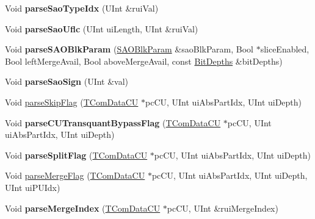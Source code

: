 \begin{DoxyCompactItemize}
\mbox{\label{class_t_dec_sbac_a43d19dfba15d817fd9676cc2f1a2d6d7}} 
Void {\bfseries parse\+Sao\+Type\+Idx} (U\+Int \&rui\+Val)
\item 
\mbox{\label{class_t_dec_sbac_ab4474e33f992ee7f021cfc5bdb618d3d}} 
Void {\bfseries parse\+Sao\+Uflc} (U\+Int ui\+Length, U\+Int \&rui\+Val)
\item 
\mbox{\label{class_t_dec_sbac_ab8f3fa94035abf0ac7531f4d63c73e01}} 
Void {\bfseries parse\+S\+A\+O\+Blk\+Param} (\hyperlink{struct_s_a_o_blk_param}{S\+A\+O\+Blk\+Param} \&sao\+Blk\+Param, Bool $\ast$slice\+Enabled, Bool left\+Merge\+Avail, Bool above\+Merge\+Avail, const \hyperlink{struct_bit_depths}{Bit\+Depths} \&bit\+Depths)
\item 
\mbox{\label{class_t_dec_sbac_aba0f9bd947829b5cff6e48a3c7440ff6}} 
Void {\bfseries parse\+Sao\+Sign} (U\+Int \&val)
\item 
Void \hyperlink{class_t_dec_sbac_a6cb8fe179c1ea3c06392e3488aa83428}{parse\+Skip\+Flag} (\hyperlink{class_t_com_data_c_u}{T\+Com\+Data\+CU} $\ast$pc\+CU, U\+Int ui\+Abs\+Part\+Idx, U\+Int ui\+Depth)
\item 
\mbox{\label{class_t_dec_sbac_ace37c59fe585382f541ae16ec3d69e9d}} 
Void {\bfseries parse\+C\+U\+Transquant\+Bypass\+Flag} (\hyperlink{class_t_com_data_c_u}{T\+Com\+Data\+CU} $\ast$pc\+CU, U\+Int ui\+Abs\+Part\+Idx, U\+Int ui\+Depth)
\item 
\mbox{\label{class_t_dec_sbac_a36ef8fc381ab983015199894b38ab376}} 
Void {\bfseries parse\+Split\+Flag} (\hyperlink{class_t_com_data_c_u}{T\+Com\+Data\+CU} $\ast$pc\+CU, U\+Int ui\+Abs\+Part\+Idx, U\+Int ui\+Depth)
\item 
Void \hyperlink{class_t_dec_sbac_a17c841c32cb4c3e4c15d765b31771628}{parse\+Merge\+Flag} (\hyperlink{class_t_com_data_c_u}{T\+Com\+Data\+CU} $\ast$pc\+CU, U\+Int ui\+Abs\+Part\+Idx, U\+Int ui\+Depth, U\+Int ui\+P\+U\+Idx)
\item 
\mbox{\label{class_t_dec_sbac_a770c67cdecee3ce4a22ad51aa3baa396}} 
Void {\bfseries parse\+Merge\+Index} (\hyperlink{class_t_com_data_c_u}{T\+Com\+Data\+CU} $\ast$pc\+CU, U\+Int \&rui\+Merge\+Index)
\item 

\end{DoxyCompactItemize}
